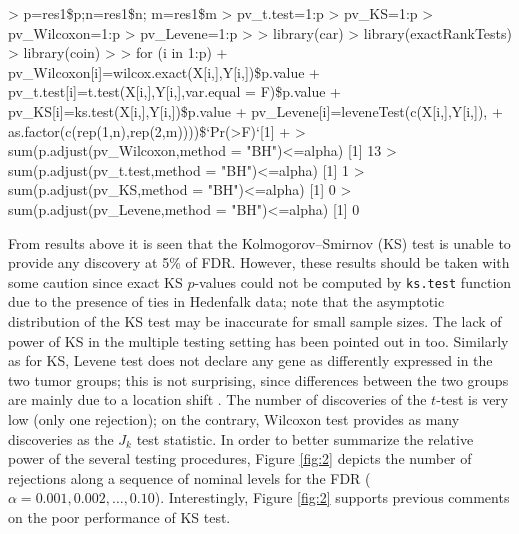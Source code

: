 \begin{example}
	> p=res1\$p;n=res1\$n; m=res1\$m
	> pv_t.test=1:p
	> pv_KS=1:p
	> pv_Wilcoxon=1:p
	> pv_Levene=1:p
	> 
	> library(car)
	> library(exactRankTests)
	> library(coin)
	> 
	> for (i in 1:p){
		+   pv_Wilcoxon[i]=wilcox.exact(X[i,],Y[i,])\$p.value
		+   pv_t.test[i]=t.test(X[i,],Y[i,],var.equal = F)\$p.value
		+   pv_KS[i]=ks.test(X[i,],Y[i,])\$p.value
		+   pv_Levene[i]=leveneTest(c(X[i,],Y[i,]),
		+   as.factor(c(rep(1,n),rep(2,m))))\$`Pr(>F)`[1]
		+ }	
	> sum(p.adjust(pv_Wilcoxon,method = "BH")<=alpha)
	[1] 13
	> sum(p.adjust(pv_t.test,method = "BH")<=alpha)
	[1] 1
	> sum(p.adjust(pv_KS,method = "BH")<=alpha)
	[1] 0
	> sum(p.adjust(pv_Levene,method = "BH")<=alpha)
	[1] 0
\end{example}

From results above it is seen that the Kolmogorov–Smirnov (KS) test is unable to provide any discovery at 5\% of FDR. However, these results should be taken with some caution since exact KS $p$-values could not be computed by \texttt{ks.test} function due to the presence of ties in Hedenfalk data; note that the asymptotic distribution of the KS test may be inaccurate for small sample sizes. The lack of power of  KS in the multiple testing setting has been pointed out in \cite{Marta3} too. Similarly as for KS, Levene test does not declare any gene as differently expressed in the two tumor groups; this is not surprising, since differences between the two groups are mainly due to a location shift \citep{He}. The number of discoveries of the $t$-test is very low (only one rejection); on the contrary, Wilcoxon test provides as many discoveries as the $J_k$ test statistic. In order to better summarize the relative power of the several testing procedures, Figure \ref{fig:2} depicts the number of rejections along a sequence of nominal levels for the FDR ($\alpha = 0.001, 0.002, \dots, 0.10$). Interestingly, Figure \ref{fig:2} supports previous comments on the poor performance of KS test.



